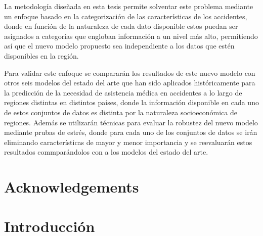 \documentclass{uathesis-es}
\begin{document}
La metodología diseñada en esta tesis permite solventar este problema mediante un enfoque basado en la categorización de las características de los accidentes, donde en función de la naturaleza de cada dato disponible estos puedan ser asignados a categorías que engloban información a un nivel más alto, permitiendo así que el nuevo modelo propuesto sea independiente a los datos que estén disponibles en la región.


Para validar este enfoque se compararán los resultados de este nuevo modelo con otros seis modelos del estado del arte que han sido aplicados históricamente para la predicción de la necesidad de asistencia médica en accidentes a lo largo de regiones distintas en distintos países, donde la información disponible en cada uno de estos conjuntos de datos es distinta por la naturaleza socioeconómica de regiones. Además se utilizarán técnicas para evaluar la robustez del nuevo modelo mediante prubas de estrés, donde para cada uno de los conjuntos de datos se irán eliminando características de mayor y menor importancia y se reevaluarán estos resultados commparándolos con a los modelos del estado del arte.

\chapter*{Acknowledgements}
\addtocounter{chapter}{0}




\chapter{Introducción}


\end{document}
